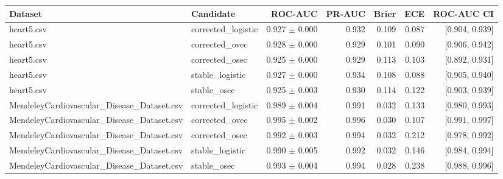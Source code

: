 \begin{tabular}{llrrrrr}
\toprule
Dataset & Candidate & ROC-AUC & PR-AUC & Brier & ECE & ROC-AUC CI \\
\midrule
heart5.csv & corrected\_logistic & 0.927 $\pm$ 0.000 & 0.932 & 0.109 & 0.087 & [0.904, 0.939] \\
heart5.csv & corrected\_ovec & 0.928 $\pm$ 0.000 & 0.929 & 0.101 & 0.090 & [0.906, 0.942] \\
heart5.csv & corrected\_osec & 0.925 $\pm$ 0.000 & 0.929 & 0.113 & 0.103 & [0.892, 0.931] \\
heart5.csv & stable\_logistic & 0.927 $\pm$ 0.000 & 0.934 & 0.108 & 0.088 & [0.905, 0.940] \\
heart5.csv & stable\_osec & 0.925 $\pm$ 0.003 & 0.930 & 0.114 & 0.122 & [0.903, 0.939] \\
MendeleyCardiovascular\_Disease\_Dataset.csv & corrected\_logistic & 0.989 $\pm$ 0.004 & 0.991 & 0.032 & 0.133 & [0.980, 0.993] \\
MendeleyCardiovascular\_Disease\_Dataset.csv & corrected\_ovec & 0.995 $\pm$ 0.002 & 0.996 & 0.030 & 0.107 & [0.991, 0.997] \\
MendeleyCardiovascular\_Disease\_Dataset.csv & corrected\_osec & 0.992 $\pm$ 0.003 & 0.994 & 0.032 & 0.212 & [0.978, 0.992] \\
MendeleyCardiovascular\_Disease\_Dataset.csv & stable\_logistic & 0.990 $\pm$ 0.005 & 0.992 & 0.032 & 0.146 & [0.984, 0.994] \\
MendeleyCardiovascular\_Disease\_Dataset.csv & stable\_osec & 0.993 $\pm$ 0.004 & 0.994 & 0.028 & 0.238 & [0.988, 0.996] \\
\bottomrule
\end{tabular}
